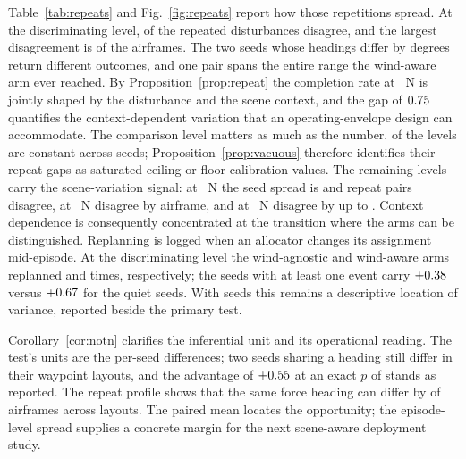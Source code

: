 Table~\ref{tab:repeats} and Fig.~\ref{fig:repeats} report how those
repetitions spread. At the discriminating level, \RepeatDisagreeKnee{}
of the \NRepeats{} repeated disturbances disagree, and the largest disagreement
is \RepeatGapKneeDrones{} of the \NDrones{} airframes. The two seeds whose
headings differ by \ClosestRepeat{} degrees return different outcomes, and one
pair spans the entire range the wind-aware arm ever reached. By Proposition~\ref{prop:repeat} the completion
rate at \KneeLevel{}~N is jointly shaped by the disturbance and the scene
context, and the gap of $0.75{}$ quantifies the context-dependent
variation that an operating-envelope design can accommodate.
The comparison level matters as much as the number. \NDegenerateLevels{} of the
\NWindLevels{} levels are constant across seeds; Proposition~\ref{prop:vacuous}
therefore identifies their repeat gaps as saturated ceiling or floor calibration
values. The remaining \NInformativeLevels{} levels carry the scene-variation signal:
at \CollapseLevel{}~N the seed spread is \CollapseSeedSpread{} and
\RepeatDisagreeCollapse{} repeat pairs disagree, at \SaturationLevel{}~N
\RepeatDisagreeShoulder{} disagree by \RepeatGapShoulderDrones{} airframe, and at
\KneeLevel{}~N \RepeatDisagreeKnee{} disagree by up to
\RepeatGapKneeDrones{}. Context dependence is consequently concentrated at the
transition where the arms can be distinguished.
Replanning is logged when an allocator changes its assignment mid-episode. At the
discriminating level the wind-agnostic and wind-aware arms replanned
\ReplanKneeAgnostic{} and \ReplanKneeAware{} times, respectively; the
\NReplanLoud{} seeds with at least one event carry $+0.38{}$ versus
$+0.67{}$ for the \NReplanQuiet{} quiet seeds. With \NSeeds{} seeds
this remains a descriptive location of variance, reported beside the primary test.

Corollary~\ref{cor:notn} clarifies the inferential unit and its operational
reading. The test's units are the \NSeeds{} per-seed differences;
two seeds sharing a heading still differ in their waypoint layouts, and the
advantage of $+0.55{}$ at an exact $p$ of \KneeP{} stands as reported.
The repeat profile shows that the same force heading can differ by
\RepeatGapKneeDrones{} of \NDrones{} airframes across layouts. The paired mean
locates the opportunity; the episode-level spread supplies a concrete margin for
the next scene-aware deployment study.

\begin{table}[tbp]
\centering
\caption{Seed-level paired record at \KneeLevel{}~N. Each row uses the same force
and waypoint layout in both arms. Heading is drawn once per seed and reused across
force levels; completion is the number of finished airframes, and replanning is the
number of mid-episode assignment changes.}
\label{tab:seedpairs}
\end{table}

